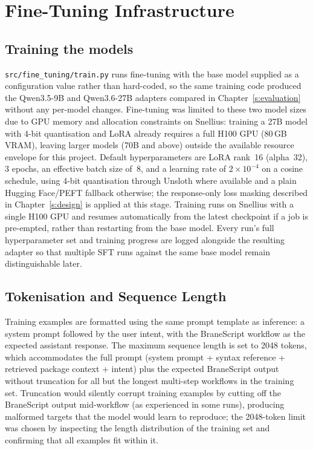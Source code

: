 \section{Fine-Tuning Infrastructure}\label{s:finetune-impl}

\subsection{Training the models}

\texttt{src/fine\_tuning/train.py} runs fine-tuning with the base model
supplied as a configuration value rather than hard-coded, so the same training code
produced the Qwen3.5-9B and Qwen3.6-27B adapters compared in
Chapter~\ref{s:evaluation} without any per-model changes. Fine-tuning was
limited to these two model sizes due to GPU memory and allocation constraints
on Snellius: training a 27B model with 4-bit quantisation and LoRA already
requires a full H100 GPU (80\,GB VRAM), leaving larger models (70B and above)
outside the available resource envelope for this project. Default
hyperparameters are LoRA rank~16 (alpha~32), 3 epochs, an effective batch
size of~8, and a learning rate of $2\times10^{-4}$ on a cosine schedule,
using 4-bit quantisation through Unsloth where available and a plain
Hugging Face/PEFT fallback otherwise; the response-only loss masking
described in Chapter~\ref{s:design} is applied at this stage. Training runs
on Snellius with a single H100 GPU and resumes automatically from the latest checkpoint
if a job is pre-empted, rather than restarting from the base model. 
Every run's full hyperparameter set and training progress are logged
alongside the resulting adapter so that multiple SFT runs against the same
base model remain distinguishable later.

\subsection{Tokenisation and Sequence Length}

Training examples are formatted using the same prompt template as inference:
a system prompt followed by the user intent, with the BraneScript workflow as
the expected assistant response. The maximum sequence length is set to 2048
tokens, which accommodates the full prompt (system prompt + syntax reference
+ retrieved package context + intent) plus the expected BraneScript output
without truncation for all but the longest multi-step workflows in the
training set. Truncation would silently corrupt training examples by cutting
off the BraneScript output mid-workflow (as experienced in some runs),
producing malformed targets that the model would learn to reproduce; the 2048-token limit was chosen by inspecting
the length distribution of the training set and confirming that all examples
fit within it.

